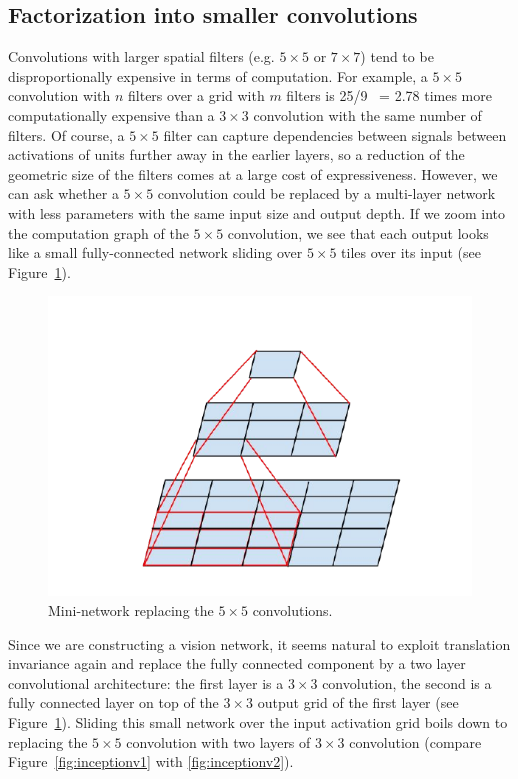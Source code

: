 \subsection{Factorization into smaller convolutions}
\label{factorizing}
Convolutions with larger spatial filters (e.g. $5\times 5$ or
$7\times 7$) tend to be disproportionally expensive in terms of computation.
For example, a $5\times 5$ convolution
with $n$ filters over a grid with $m$ filters is 25/9 ~= 2.78 times
more computationally expensive
than a $3\times 3$ convolution with the same number of filters. Of course, a
$5\times 5$
filter can capture dependencies between signals between activations of units
further away in the earlier layers, so a reduction of the geometric size of the
filters comes at a large cost of expressiveness. However,
we can ask whether a $5\times 5$ convolution could be
replaced by a multi-layer network with less parameters with the same input
size and output depth. If we zoom into the computation graph of the
$5\times 5$ convolution, we see that each output looks like a small
fully-connected network sliding over $5\times 5$ tiles over its input
(see Figure~\ref{fig:double3}).
\begin{figure}
\centering
\includegraphics[width=\linewidth]{double3x3}
\caption{Mini-network replacing the $5\times 5$ convolutions.}
\label{fig:double3}
\end{figure}
Since we are constructing a vision network, it seems natural to
exploit translation invariance again and replace the fully connected component
by a two layer convolutional architecture: the first layer is a $3\times 3$
convolution, the second is a fully connected layer on top of the $3\times 3$
output grid of the first layer (see Figure~\ref{fig:double3}).
Sliding this small network over the input activation grid boils down to
replacing the $5\times 5$ convolution with two layers of $3\times 3$
convolution (compare Figure~\ref{fig:inceptionv1} with \ref{fig:inceptionv2}).

